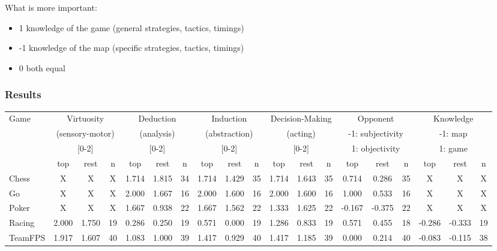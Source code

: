 What is more important:
\begin{itemize}
    \item 1 knowledge of the game (general strategies, tactics, timings)
    \item -1 knowledge of the map (specific strategies, tactics, timings)
    \item 0 both equal
\end{itemize}

\subsubsection{Results}

\begin{table}

\begin{tabular}{|l|ccc|ccc|ccc|ccc|ccc|ccc|}
\hline
Game & \multicolumn{3}{|c|}{Virtuosity} & \multicolumn{3}{|c|}{Deduction} & \multicolumn{3}{|c|}{Induction} & \multicolumn{3}{|c|}{Decision-Making} & \multicolumn{3}{|c|}{Opponent} & \multicolumn{3}{|c|}{Knowledge}\\
 & \multicolumn{3}{|c|}{(sensory-motor)} & \multicolumn{3}{|c|}{(analysis)} & \multicolumn{3}{|c|}{(abstraction)} & \multicolumn{3}{|c|}{(acting)} & \multicolumn{3}{|c|}{-1: subjectivity} & \multicolumn{3}{|c|}{-1: map} \\
 & \multicolumn{3}{|c|}{[0-2]} & \multicolumn{3}{|c|}{[0-2]} & \multicolumn{3}{|c|}{[0-2]} & \multicolumn{3}{|c|}{[0-2]} & \multicolumn{3}{|c|}{1: objectivity} & \multicolumn{3}{|c|}{1: game} \\
 & top & rest & n & top & rest & n & top & rest & n & top & rest & n & top & rest & n & top & rest & n \\
\hline
Chess &  X & X & X  & 1.714 & 1.815 & 34 & 1.714 & 1.429 & 35 & 1.714 & 1.643 & 35 & 0.714 & 0.286 & 35 &  X & X & X  \\
Go &  X & X & X  & 2.000 & 1.667 & 16 & 2.000 & 1.600 & 16 & 2.000 & 1.600 & 16 & 1.000 & 0.533 & 16 &  X & X & X  \\
Poker &  X & X & X  & 1.667 & 0.938 & 22 & 1.667 & 1.562 & 22 & 1.333 & 1.625 & 22 & -0.167 & -0.375 & 22 &  X & X & X  \\
Racing & 2.000 & 1.750 & 19 & 0.286 & 0.250 & 19 & 0.571 & 0.000 & 19 & 1.286 & 0.833 & 19 & 0.571 & 0.455 & 18 & -0.286 & -0.333 & 19 \\
TeamFPS & 1.917 & 1.607 & 40 & 1.083 & 1.000 & 39 & 1.417 & 0.929 & 40 & 1.417 & 1.185 & 39 & 0.000 & 0.214 & 40 & -0.083 & -0.115 & 38 \\

\end{tabular}
\end{table}

